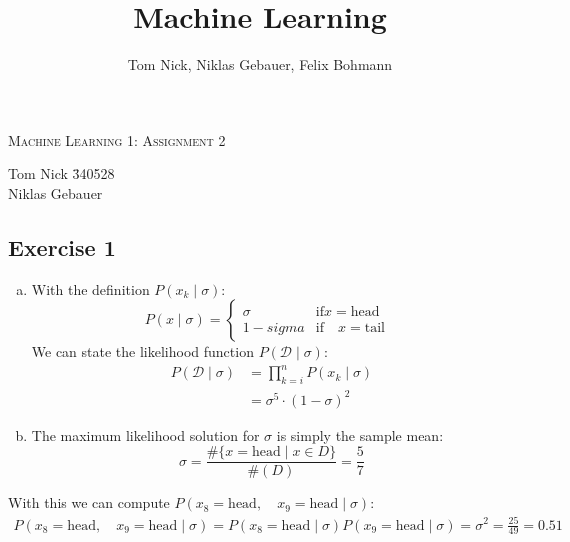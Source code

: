 \documentclass[10pt,a4paper]{article}
\author{Tom Nick, Niklas Gebauer, Felix Bohmann}
\title{Machine Learning}
\newcommand{\D}{\mathcal{D}}
\begin{document}
\begin{center}
\Large{\textsc{Machine Learning 1: Assignment 2}} \\
\end{center}

\begin{tabbing}
Tom Nick \hspace{0.9cm}\= 340528\\
Niklas Gebauer 
\end{tabbing}

\subsection*{Exercise 1}
\begin{enumerate}[(a)]
\item 
With the definition $P(x_k \mid \sigma)$:
$$P(x \mid \sigma) = \begin{cases} \sigma &\text{if} x = \text{head}\quad \\ 1 - sigma &\text{if}\quad x = \text{tail} \end{cases}$$
We can state the likelihood function $P(\D \mid \sigma)$:
\begin{align*}
	P(\D \mid \sigma) &= \prod_{k = i}^{n} P(x_k \mid \sigma) \\
	&= \sigma^5 \cdot (1 - \sigma)^2
\end{align*}
\item
The maximum likelihood solution for $\sigma$ is simply the sample mean:
$$\sigma = \frac{\#\{ x = \text{head} \mid x \in D\}}{\#(D)} = \frac{5}{7}$$
\end{enumerate}
With this we can compute $P(x_8 = \text{head} ,\quad x_9 = \text{head} \mid \sigma)$:
\begin{align*}
P(x_8 = \text{head} ,\quad x_9 = \text{head} \mid \sigma) = P(x_8 = \text{head} \mid \sigma)P(x_9 = \text{head} \mid \sigma) = \sigma^2 = \frac{25}{49} = 0.51
\end{align*}
\end{document}
